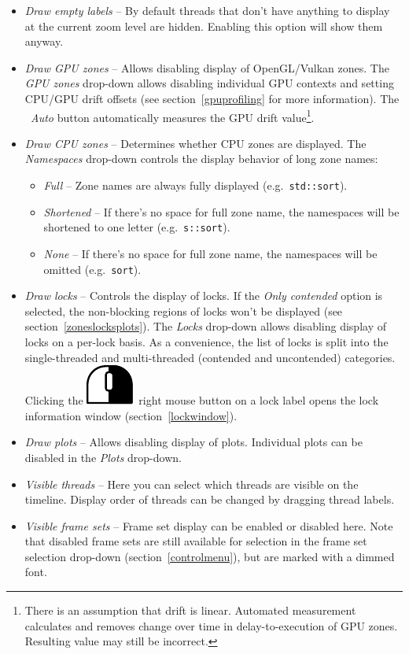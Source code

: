 \documentclass[hidelinks,titlepage,a4paper]{article}
\newcommand{\RMB}{\includegraphics[height=.8\baselineskip]{icons/rmb}}
\begin{document}
\begin{itemize}
\item \emph{\faExpand{} Draw empty labels} -- By default threads that don't have anything to display at the current zoom level are hidden. Enabling this option will show them anyway.
\item \emph{\faEye{} Draw GPU zones} -- Allows disabling display of OpenGL/Vulkan zones. The \emph{GPU zones} drop-down allows disabling individual GPU contexts and setting CPU/GPU drift offsets (see section~\ref{gpuprofiling} for more information). The \emph{\faRobot~Auto} button automatically measures the GPU drift value\footnote{There is an assumption that drift is linear. Automated measurement calculates and removes change over time in delay-to-execution of GPU zones. Resulting value may still be incorrect.}.
\item \emph{\faMicrochip{} Draw CPU zones} -- Determines whether CPU zones are displayed. The \emph{Namespaces} drop-down controls the display behavior of long zone names:
\begin{itemize}
\item \emph{Full} -- Zone names are always fully displayed (e.g.\ \texttt{std::sort}).
\item \emph{Shortened} -- If there's no space for full zone name, the namespaces will be shortened to one letter (e.g.\ \texttt{s::sort}).
\item \emph{None} -- If there's no space for full zone name, the namespaces will be omitted (e.g.\ \texttt{sort}).
\end{itemize}
\item \emph{\faLock{} Draw locks} -- Controls the display of locks. If the \emph{Only contended} option is selected, the non-blocking regions of locks won't be displayed (see section~\ref{zoneslocksplots}). The \emph{Locks} drop-down allows disabling display of locks on a per-lock basis. As a convenience, the list of locks is split into the single-threaded and multi-threaded (contended and uncontended) categories. Clicking the \RMB{}~right mouse button on a lock label opens the lock information window (section~\ref{lockwindow}).
\item \emph{\faSignature{} Draw plots} -- Allows disabling display of plots. Individual plots can be disabled in the \emph{Plots} drop-down.
\item \emph{\faRandom{} Visible threads} -- Here you can select which threads are visible on the timeline. Display order of threads can be changed by dragging thread labels.
\item \emph{\faImages{} Visible frame sets} -- Frame set display can be enabled or disabled here. Note that disabled frame sets are still available for selection in the frame set selection drop-down (section~\ref{controlmenu}), but are marked with a dimmed font.
\end{itemize}
\end{document}
